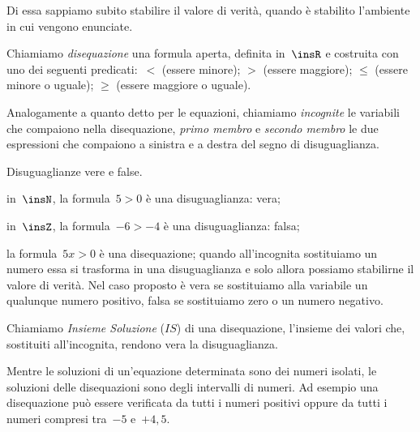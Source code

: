 Di essa sappiamo subito stabilire il valore di verità, quando è
stabilito l'ambiente in cui vengono enunciate.

\begin{definizione}
Chiamiamo \emph{disequazione} una formula aperta,
definita in~\(\insR\) e costruita con uno dei seguenti predicati:~\(<\)
(essere minore); \(>\) (essere maggiore); \({\leq}\)
(essere minore o uguale); \({\geq}\) (essere
maggiore o uguale).
\end{definizione}

Analogamente a quanto detto per le equazioni, chiamiamo
\emph{incognite} le variabili che compaiono nella disequazione,
\emph{primo membro} e \emph{secondo membro} le due espressioni che
compaiono a sinistra e a destra del segno di disuguaglianza.

 \begin{esempio}
 Disuguaglianze vere e false.

 \begin{enumeratea}
\item in~\(\insN\), la formula~\(5>0\) è una disuguaglianza: vera;
\item in~\(\insZ\), la formula~\(-6>-4\) è una disuguaglianza: falsa;
\item la formula~\(5x>0\) è una disequazione; quando
all'incognita sostituiamo un numero essa si trasforma
in una disuguaglianza e solo allora possiamo stabilirne il valore di
verità. Nel caso proposto è vera se sostituiamo
alla variabile un qualunque numero positivo, falsa se
sostituiamo zero o un numero negativo.
\end{enumeratea}
 \end{esempio}



\begin{definizione}
Chiamiamo \emph{Insieme Soluzione} (\(IS\)) di una disequazione, l'insieme 
dei valori che, sostituiti all'incognita, rendono vera la disuguaglianza.
\end{definizione}

Mentre le soluzioni di un'equazione determinata sono dei numeri isolati, 
le soluzioni delle disequazioni sono degli intervalli di numeri.
Ad esempio una disequazione può essere verificata da tutti i numeri positivi 
oppure da tutti i numeri compresi tra~\(-5\) e~\(+4,5\).

